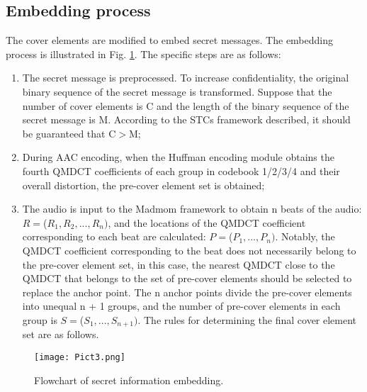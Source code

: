 \documentclass[12pt]{article}
\begin{document}
\subsection{Embedding process}
The cover elements are modified to embed secret messages. The embedding process is illustrated in Fig. \ref{Pic3}. The specific steps are as follows: 
\begin{enumerate}
\item The secret message is preprocessed. To increase confidentiality, the original binary sequence of the secret message is transformed. Suppose that the number of cover elements is C and the length of the binary sequence of the secret message is M. According to the STCs framework described, it should be guaranteed that C$>$M;
\item During AAC encoding, when the Huffman encoding module obtains the fourth QMDCT coefficients of each group in codebook 1/2/3/4 and their overall distortion, the pre-cover element set is obtained; 
\item The audio is input to the Madmom framework to obtain n beats of the audio: $R = $($R_1, R_2, ... , R_n)$, and the locations of the QMDCT coefficient corresponding to each beat are calculated: $P = $($P_1, ... , P_n)$. Notably, the QMDCT coefficient corresponding to the beat does not necessarily belong to the pre-cover element set, in this case, the nearest QMDCT close to the QMDCT that belongs to the set of pre-cover elements should be selected to replace the anchor point. The n anchor points divide the pre-cover elements into unequal n + 1 groups, and the number of pre-cover elements in each group is $S = $($S_1, ... , S_{n+1})$. The rules for determining the final cover element set are as follows.
\end{enumerate}
\begin{figure}[H]
    \label{Pic3}
    \centering
    \texttt{[image: Pict3.png]}
    \caption{Flowchart of secret information embedding.}
\end{figure}
\end{document}
